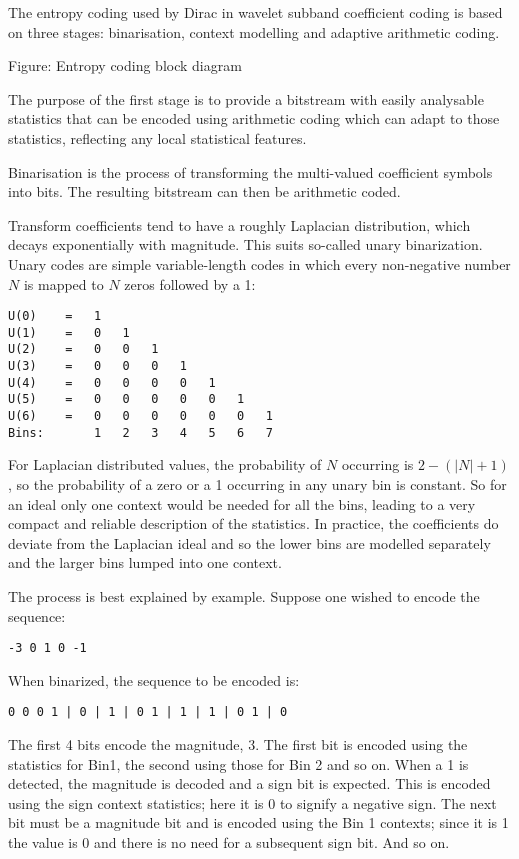 The entropy coding used by Dirac in wavelet subband coefficient coding
is based on three stages: binarisation, context modelling and adaptive
arithmetic coding.

Figure: Entropy coding block diagram

The purpose of the first stage is to provide a bitstream with easily
analysable statistics that can be encoded using arithmetic coding which
can adapt to those statistics, reflecting any local statistical
features.

Binarisation is the process of transforming the multi-valued coefficient
symbols into bits. The resulting bitstream can then be arithmetic coded.

Transform coefficients tend to have a roughly Laplacian distribution,
which decays exponentially with magnitude. This suits so-called unary
binarization. Unary codes are simple variable-length codes in which
every non-negative number $N$ is mapped to $N$ zeros followed by a 1:


\begin{verbatim}
U(0)    =   1
U(1)    =   0   1
U(2)    =   0   0   1
U(3)    =   0   0   0   1
U(4)    =   0   0   0   0   1
U(5)    =   0   0   0   0   0   1
U(6)    =   0   0   0   0   0   0   1
Bins:       1   2   3   4   5   6   7
\end{verbatim}

For Laplacian distributed values, the probability of $N$ occurring is
$2-(|N|+1)$, so the probability of a zero or a 1 occurring in any unary
bin is constant. So for an ideal only one context would be needed for
all the bins, leading to a very compact and reliable description of the
statistics. In practice, the coefficients do deviate from the Laplacian
ideal and so the lower bins are modelled separately and the larger bins
lumped into one context.

The process is best explained by example. Suppose one wished to encode
the sequence:

\begin{verbatim}
-3 0 1 0 -1
\end{verbatim}

When binarized, the sequence to be encoded is:

\begin{verbatim}
0 0 0 1 | 0 | 1 | 0 1 | 1 | 1 | 0 1 | 0
\end{verbatim}

The first 4 bits encode the magnitude, 3. The first bit is encoded using
the statistics for Bin1, the second using those for Bin 2 and so on.
When a 1 is detected, the magnitude is decoded and a sign bit is
expected. This is encoded using the sign context statistics; here it is
0 to signify a negative sign. The next bit must be a magnitude bit and
is encoded using the Bin 1 contexts; since it is 1 the value is 0 and
there is no need for a subsequent sign bit. And so on.

